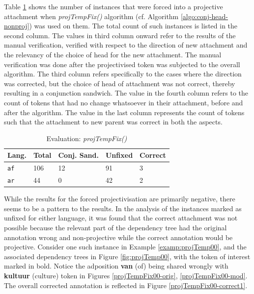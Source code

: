 Table \ref{tab:projTempFixResults} shows the number of instances that were forced into a projective attachment when \textit{projTempFix()} algorithm (cf. Algorithm \ref{algo:conj-head-nonproj}) was used on them. The total count of such instances is listed in the second column. The values in third column onward refer to the results of the manual verification, verified with respect to the direction of new attachment and the relevancy of the choice of head for the new attachment. The manual verification was done after the projectivised token was subjected to the overall algorithm. The third column refers specifically to the cases where the direction was corrected, but the choice of head of attachment was not correct, thereby resulting in a conjunction sandwich. The value in the fourth column refers to the count of tokens that had no change whatsoever in their attachment, before and after the algorithm. The value in the last column represents the count of tokens such that the attachment to new parent was correct in both the aspects.

\begin{table}[H]
    \centering
    \begin{tabular}{|l|l|l|l|l|}
    \hline
    \textbf{Lang.} & \textbf{Total} & Conj. Sand. & Unfixed & Correct\\
    \hline
    \texttt{af} & 106 & 12 & 91 & 3\\
    \texttt{ar} & 44 & 0 & 42 & 2\\
    \hline
    \end{tabular}
    \caption{Evaluation: \textit{projTempFix()}}
    \label{tab:projTempFixResults}
\end{table}

While the results for the forced projectivisation are primarily negative, there seems to be a pattern to the results. In the analysis of the instances marked as unfixed for either language, it was found that the correct attachment was not possible because the relevant part of the dependency tree had the original annotation wrong and non-projective while the correct annotation would be projective. Consider one such instance in Example \ref{examp:projTemp00}, and the associated dependency trees in Figure \ref{fig:projTemp00}, with the token of interest marked in bold. Notice the adposition \textbf{van} (of) being shared wrongly with \textbf{kultuur} (culture) token in Figures \ref{projTempFix00-orig}, \ref{projTempFix00-mod}. The overall corrected annotation is reflected in Figure \ref{projTempFix00-correct1}.

